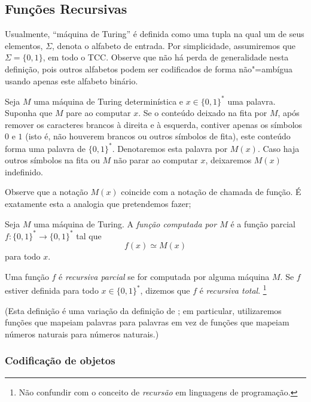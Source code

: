 \subsection{Funções Recursivas}

Usualmente,
``máquina de Turing'' é definida como uma tupla
na qual um de seus elementos,
$\Sigma$,
denota o alfabeto de entrada.
Por simplicidade,
assumiremos que $\Sigma = \{0, 1\}$,
em todo o TCC.
Observe que não há perda de generalidade nesta definição,
pois outros alfabetos podem ser codificados de forma não"=ambígua
usando apenas este alfabeto binário.

\begin{notation}
    Seja $M$ uma máquina de Turing determinística
    e $x \in \{0, 1\}^*$ uma palavra.
    Suponha que $M$ pare ao computar $x$.
    Se o conteúdo deixado na fita por $M$,
    após remover os caracteres brancos à direita e à esquerda,
    contiver apenas os símbolos $0$ e $1$
    (isto é, não houverem brancos ou outros símbolos de fita),
    este conteúdo forma uma palavra de $\{0, 1\}^*$.
    Denotaremos esta palavra por $M(x)$.
    Caso haja outros símbolos na fita
    ou $M$ não parar ao computar $x$,
    deixaremos $M(x)$ indefinido.
\end{notation}

Observe que a notação $M(x)$ coincide com a notação de chamada de função.
É exatamente esta a analogia que pretendemos fazer;

\begin{definition}
    \label{def:recursive_function}
    Seja $M$ uma máquina de Turing.
    A \emph{função computada por $M$}
    é a função parcial $f: \{0, 1\}^* \to \{0, 1\}^*$ tal que
    \begin{equation*}
        f(x) \simeq M(x)
    \end{equation*}
    para todo $x$.

    Uma função $f$ é \emph{recursiva parcial}
    se for computada por alguma máquina $M$.
    Se $f$ estiver definida para todo $x \in \{0, 1\}^*$,
    dizemos que $f$ é \emph{recursiva total}.
    \footnote{
        Não confundir com o conceito de \emph{recursão} em linguagens de programação.
    }
\end{definition}
(Esta definição é uma variação da definição de ;
em particular, utilizaremos funções que mapeiam palavras para palavras
em vez de funções que mapeiam números naturais para números naturais.)

\subsubsection{Codificação de objetos}
\label{sec:binary_encoding}

